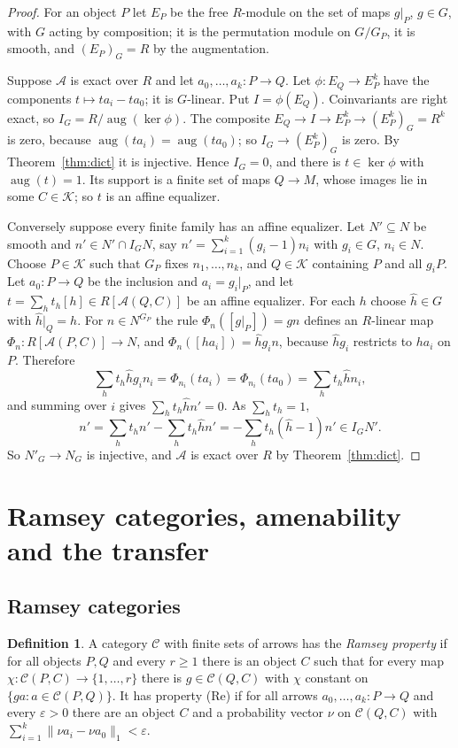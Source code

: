 \documentclass[11pt,a4paper]{article}
\theoremstyle{definition}
\newtheorem{definition}[theorem]{Definition}
\newcommand{\A}{\mathcal{A}}
\newcommand{\K}{\mathcal{K}}
\newcommand{\C}{\mathcal{C}}
\newcommand{\aug}{\operatorname{aug}}
\begin{document}
\begin{proof}
For an object $P$ let $E_P$ be the free $R$-module on the set of maps
$g|_P$, $g\in G$, with $G$ acting by composition; it is the permutation
module on $G/G_P$, it is smooth, and $(E_P)_G=R$ by the augmentation.

Suppose $\A$ is exact over $R$ and let $a_0,\dots,a_k\colon P\to Q$. Let
$\phi\colon E_Q\to E_P^k$ have the components $t\mapsto ta_i-ta_0$; it is
$G$-linear. Put $I=\phi(E_Q)$. Coinvariants are right exact, so
$I_G=R/\aug(\ker\phi)$. The composite $E_Q\to I\to E_P^k\to(E_P^k)_G=R^k$
is zero, because $\aug(ta_i)=\aug(ta_0)$; so $I_G\to(E_P^k)_G$ is zero. By
Theorem~\ref{thm:dict} it is injective. Hence $I_G=0$, and there is
$t\in\ker\phi$ with $\aug(t)=1$. Its support is a finite set of maps
$Q\to M$, whose images lie in some $C\in\K$; so $t$ is an affine equalizer.

Conversely suppose every finite family has an affine equalizer. Let
$N'\subseteq N$ be smooth and $n'\in N'\cap I_GN$, say
$n'=\sum_{i=1}^k(g_i-1)n_i$ with $g_i\in G$, $n_i\in N$. Choose $P\in\K$
such that $G_P$ fixes $n_1,\dots,n_k$, and $Q\in\K$ containing $P$ and all
$g_iP$. Let $a_0\colon P\to Q$ be the inclusion and $a_i=g_i|_P$, and let
$t=\sum_ht_h[h]\in R[\A(Q,C)]$ be an affine equalizer. For each $h$ choose
$\hat h\in G$ with $\hat h|_Q=h$. For $n\in N^{G_P}$ the rule
$\Phi_n([g|_P])=gn$ defines an $R$-linear map $\Phi_n\colon R[\A(P,C)]\to N$,
and $\Phi_n([ha_i])=\hat hg_in$, because $\hat hg_i$ restricts to $ha_i$ on
$P$. Therefore
\[
 \sum_ht_h\hat hg_in_i=\Phi_{n_i}(ta_i)=\Phi_{n_i}(ta_0)=\sum_ht_h\hat hn_i ,
\]
and summing over $i$ gives $\sum_ht_h\hat hn'=0$. As $\sum_ht_h=1$,
\[
 n'=\sum_ht_hn'-\sum_ht_h\hat hn'=-\sum_ht_h(\hat h-1)n'\in I_GN'.
\]
So $N'_G\to N_G$ is injective, and $\A$ is exact over $R$ by
Theorem~\ref{thm:dict}.
\end{proof}

\section{Ramsey categories, amenability and the transfer}\label{sec:transfer}

\subsection{Ramsey categories}

\begin{definition}\label{def:RP}
A category $\C$ with finite sets of arrows has the \emph{Ramsey property}
if for all objects $P,Q$ and every $r\ge1$ there is an object $C$ such that
for every map $\chi\colon\C(P,C)\to\{1,\dots,r\}$ there is $g\in\C(Q,C)$
with $\chi$ constant on $\{ga:a\in\C(P,Q)\}$. It has property
\textup{(Re)} if for all arrows $a_0,\dots,a_k\colon P\to Q$ and every
$\varepsilon>0$ there are an object $C$ and a probability vector $\nu$ on
$\C(Q,C)$ with $\sum_{i=1}^k\|\nu a_i-\nu a_0\|_1<\varepsilon$.
\end{definition}
\end{document}
